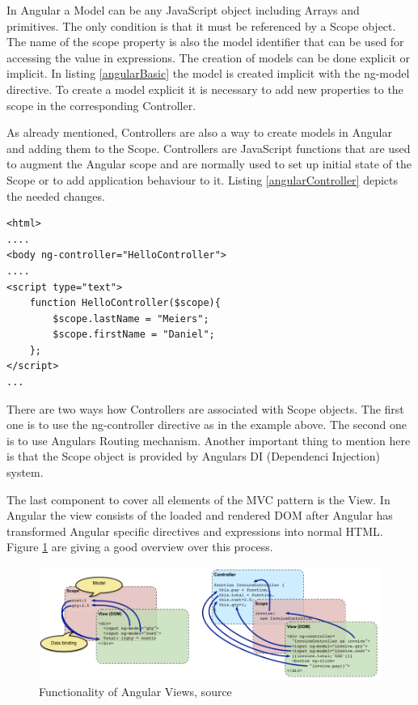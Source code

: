In Angular a Model can be any JavaScript object including Arrays and primitives.
The only condition is that it must be referenced by a Scope object.
The name of the scope property is also the model identifier that can be used for accessing the value in expressions.
The creation of models can be done explicit or implicit.
In listing \ref{angularBasic} the model is created implicit with the ng-model directive.
To create a model explicit it is necessary to add new properties to the scope in the corresponding Controller.

As already mentioned, Controllers are also a way to create models in Angular and adding them to the Scope.
Controllers are JavaScript functions that are used to augment the Angular scope and are normally used to set up initial state of the Scope or to add application behaviour to it.
Listing \ref{angularController} depicts the needed changes.

\begin{lstlisting}[label=angularController,caption=Angular Controller]
<html>
....
<body ng-controller="HelloController">
....
<script type="text">
	function HelloController($scope){
	    $scope.lastName = "Meiers";
	    $scope.firstName = "Daniel";
	};
</script>
...
\end{lstlisting}

There are two ways how Controllers are associated with Scope objects.
The first one is to use the ng-controller directive as in the example above.
The second one is to use Angulars Routing mechanism.
Another important thing to mention here is that the Scope object is provided by Angulars DI (Dependenci Injection) system.
  

The last component to cover all elements of the MVC pattern is the View.
In Angular the view consists of the loaded and rendered DOM after Angular has transformed Angular specific directives and expressions into normal HTML.
Figure \ref{fig:angular_views} are giving a good overview over this process.
  
\begin{figure}
	\centering	
	\includegraphics[width=1.0\textwidth]{./img/tech-ana/angular_view.png}
	\caption{Functionality of Angular Views, source \autocite{tech-ana:ng-concepts}}
	\label{fig:angular_views}
\end{figure} 

